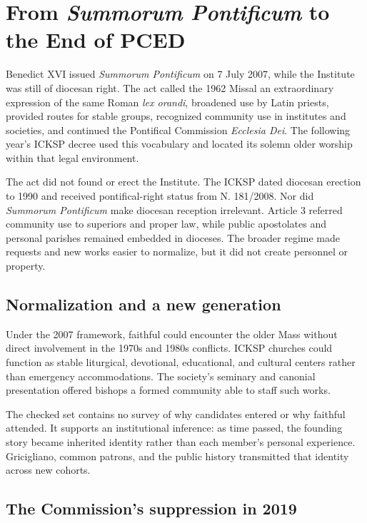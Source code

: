 \section{From \emph{Summorum Pontificum} to the End of PCED}

Benedict XVI issued \emph{Summorum Pontificum} on 7 July 2007, while the Institute was still of diocesan right. The act called the 1962 Missal an extraordinary expression of the same Roman \emph{lex orandi}, broadened use by Latin priests, provided routes for stable groups, recognized community use in institutes and societies, and continued the Pontifical Commission \emph{Ecclesia Dei}. The following year's ICKSP decree used this vocabulary and located its solemn older worship within that legal environment.

The act did not found or erect the Institute. The ICKSP dated diocesan erection to 1990 and received pontifical-right status from N. 181/2008. Nor did \emph{Summorum Pontificum} make diocesan reception irrelevant. Article 3 referred community use to superiors and proper law, while public apostolates and personal parishes remained embedded in dioceses. The broader regime made requests and new works easier to normalize, but it did not create personnel or property.

\subsection{Normalization and a new generation}

Under the 2007 framework, faithful could encounter the older Mass without direct involvement in the 1970s and 1980s conflicts. ICKSP churches could function as stable liturgical, devotional, educational, and cultural centers rather than emergency accommodations. The society's seminary and canonial presentation offered bishops a formed community able to staff such works.

The checked set contains no survey of why candidates entered or why faithful attended. It supports an institutional inference: as time passed, the founding story became inherited identity rather than each member's personal experience. Gricigliano, common patrons, and the public history transmitted that identity across new cohorts.

\subsection{The Commission's suppression in 2019}

